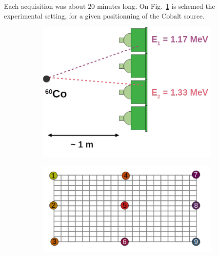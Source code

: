 Each acquisition was about $20$ minutes long.
On Fig.~\ref{fig:Co_setup} is schemed the experimental setting, for a given positionning of the Cobalt source.\\
\begin{figure}[h]
  \centering
  \begin{subfigure}[t]{0.48\textwidth}
    \centering
    \includegraphics[height=0.5\textwidth]{commissioning/fig_commissioning/Co_setup.pdf}
    \captionsetup{justification=justified}
    \caption{
      \label{fig:Co_setup}}
  \end{subfigure}
  \hfill
  \begin{subfigure}[t]{0.48\textwidth}
    \centering
    \includegraphics[height=0.5\textwidth]{commissioning/fig_commissioning/Co_setup_wall.pdf}
    \captionsetup{justification=justified}

\end{subfigure}
\end{figure}
